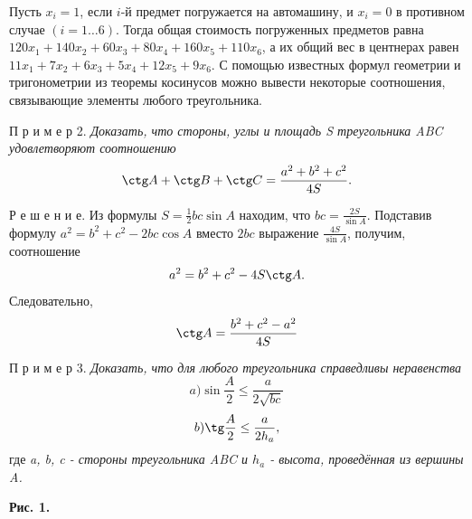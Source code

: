 \documentclass[12pt,twoside]{article}
\begin{document}
\begin{multicols}{2}
Пусть $x_i=1$, если $i$-й предмет погружается на автомашину, и $x_i=0$ в противном случае $(i=1\dots6)$. Тогда общая стоимость погруженных предметов равна $120x_1+140x_2+60x_3+80x_4+160x_5+110x_6$, а их общий вес в центнерах равен $11x_1+7x_2+6x_3+5x_4+12x_5+9x_6$.
\newpage
С помощью известных формул геометрии и тригонометрии из теоремы косинусов можно вывести некоторые соотношения, связывающие элементы любого треугольника.

П р и м е р 2. \textit{Доказать, что стороны, углы и площадь S треугольника ABC удовлетворяют соотношению} \[\ctg A+\ctg B+\ctg C=\frac{a^2+b^2+c^2}{4S}.\]

Р е ш е н и е. Из формулы $S=\frac{1}{2}bc\sin A$ находим, что $bc=\frac{2S}{\sin A}.$ Подставив формулу $a^2=b^2+c^2-2bc\cos A$ вместо $2bc$ выражение $\frac{4S}{\sin A}$, получим, соотношение \begin{equation}
    a^2=b^2+c^2-4S\ctg A.
\end{equation}
Следовательно, \[\ctg A=\frac{b^2+c^2-a^2}{4S}\]

П р и м е р 3. \textit{Доказать, что для любого треугольника справедливы неравенства}
\[a) \sin \frac{A}{2}\leq\frac{a}{2\sqrt{bc}}\]\[b) \tg\frac{A}{2}\leq\frac{a}{2h_a},\]
где \textit{a, b, c - стороны треугольника ABC и $h_a$ - высота, проведённая из вершины A.}
\end{multicols}

\newpage
{}

\textbf{Рис. 1.}
\end{document}
